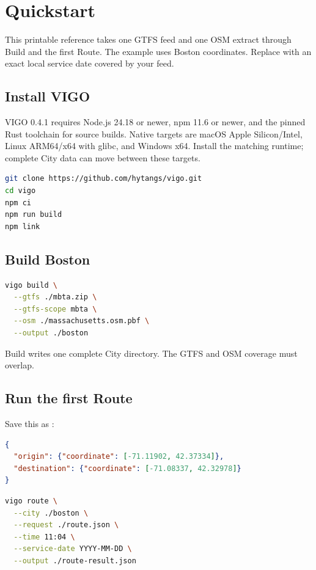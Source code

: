 \documentclass[10pt,letterpaper]{article}
\begin{document}
\guideheader

\section{Quickstart}

This printable reference takes one GTFS feed and one OSM extract through Build and the first Route. The example uses Boston coordinates. Replace  with an exact local service date covered by your feed.

\subsection{Install VIGO}

VIGO 0.4.1 requires Node.js 24.18 or newer, npm 11.6 or newer, and the pinned Rust toolchain for source builds. Native targets are macOS Apple Silicon/Intel, Linux ARM64/x64 with glibc, and Windows x64. Install the matching runtime; complete City data can move between these targets.

\begin{lstlisting}[language=bash]
git clone https://github.com/hytangs/vigo.git
cd vigo
npm ci
npm run build
npm link
\end{lstlisting}

\subsection{Build Boston}

\begin{lstlisting}[language=bash]
vigo build \
  --gtfs ./mbta.zip \
  --gtfs-scope mbta \
  --osm ./massachusetts.osm.pbf \
  --output ./boston
\end{lstlisting}

Build writes one complete City directory. The GTFS and OSM coverage must overlap.

\subsection{Run the first Route}

Save this as \code{route.json}:

\begin{lstlisting}[language=json]
{
  "origin": {"coordinate": [-71.11902, 42.37334]},
  "destination": {"coordinate": [-71.08337, 42.32978]}
}
\end{lstlisting}

\begin{lstlisting}[language=bash]
vigo route \
  --city ./boston \
  --request ./route.json \
  --time 11:04 \
  --service-date YYYY-MM-DD \
  --output ./route-result.json
\end{lstlisting}
\end{document}
